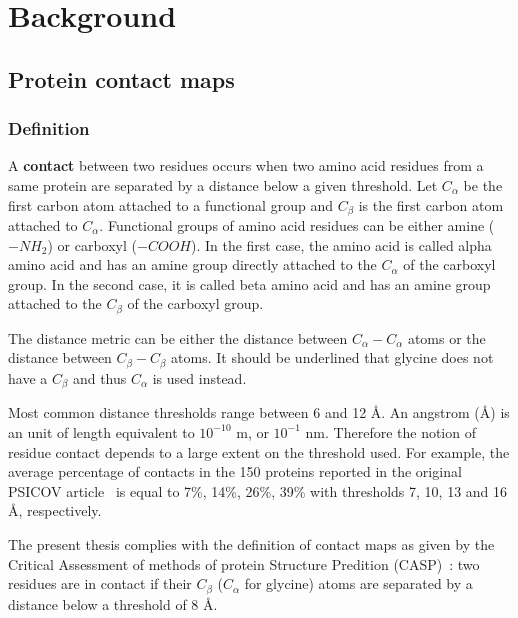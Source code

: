 \chapter{Background}

\section{Protein contact maps}

    \subsection{Definition}

        A \textbf{contact} between two residues occurs when two amino acid residues from
        a same protein are separated by a distance below a given threshold.
        Let $C_{\alpha}$ be the first carbon atom attached to a functional group and
        $C_{\beta}$ is the first carbon atom attached to $C_{\alpha}$.
        Functional groups of amino acid residues can be either
        amine ($-NH_2$) or carboxyl ($-COOH$).
        In the first case, the amino acid is called alpha amino acid and has an amine group
        directly attached to the $C_{\alpha}$ of the carboxyl group.
        In the second case, it is called beta amino acid and has an amine group attached to
        the $C_{\beta}$ of the carboxyl group.

        The distance metric can be either the distance between $C_{\alpha}-C_{\alpha}$
        atoms or the distance between $C_{\beta}-C_{\beta}$ atoms.
        It should be underlined that glycine does not have a $C_{\beta}$ and thus $C_{\alpha}$ is
        used instead.

        Most common distance thresholds range between 6 and 12 \AA{}.
        An angstrom (\AA{}) is an unit of length equivalent to $10^{-10}$ m, or $10^{-1}$ nm.
        Therefore the notion of residue contact depends to a large extent on the threshold used.
        For example, the average percentage of contacts in the 150 proteins reported in the original PSICOV
        article~\cite{doi:10.1093/bioinformatics/btr638}
        is equal to 7\%, 14\%, 26\%, 39\% with thresholds 7, 10, 13 and 16 \AA{}, respectively.

        The present thesis complies with the definition of contact maps as given by the
        Critical Assessment of methods of protein Structure Predition (CASP)~\cite{ezkurdia2009assessment}:
        two residues are in contact if their $C_{\beta}$ ($C_{\alpha}$ for glycine) atoms
        are separated by a distance below a threshold of 8 \AA{}.

